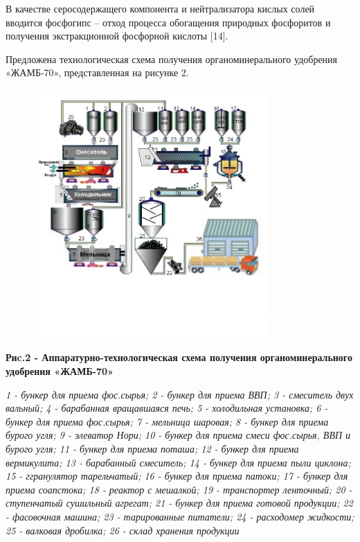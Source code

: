 В качестве серосодержащего компонента и нейтрализатора кислых солей
вводится фосфогипс -- отход процесса обогащения природных фосфоритов и
получения экстракционной фосфорной кислоты {[}14{]}.

Предложена технологическая схема получения органоминерального удобрения
«ЖАМБ-70», представленная на рисунке 2.

\begin{figure}[H]
	\centering
	\includegraphics[width=0.8\textwidth]{assets/1081}
	\caption*{}
\end{figure}

{\bfseries Риc.2 - Аппаратурно-технологическая схема получения
органоминерального удобрения «ЖАМБ-70»}

\emph{1 - бункер для приема фос.сырья; 2 - бункер для приема ВВП; 3 -
смеситель двух вальный; 4 - барабанная вращавшаяся печь; 5 - холодильная
установка; 6 - бункер для приема фос.сырья; 7 - мельница шаровая; 8 -
бункер для приема бурого угля; 9 - элеватор Нори; 10 - бункер для приема
смеси фос.сырья, ВВП и бурого угля; 11 - бункер для приема поташа; 12 -
бункер для приема вермикулита; 13 - барабанный смеситель; 14 - бункер
для приема пыли циклона; 15 - ггранулятор тарельчатый; 16 - бункер для
приема патоки; 17 - бункер для приема соапстока; 18 - реактор с
мешалкой; 19 - транспортер ленточный; 20 - ступенчатый сушильный
агрегат; 21 - бункер для приема готовой продукции; 22 - фасовочная
машина; 23 - тарированные питатели; 24 - расходомер жидкости; 25 -
валковая дробилка; 26 - склад хранения продукции}

